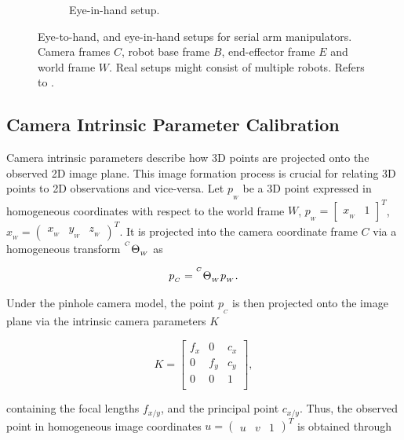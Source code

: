 \begin{figure}[tb]
\begin{subfigure}[b]{0.49\textwidth}
        \caption{Eye-in-hand setup.}
        \label{in:fig:eye_in_hand}
    \end{subfigure}
    \caption{Eye-to-hand, and eye-in-hand setups for serial arm manipulators. Camera frames $C$, robot base frame $B$, end-effector frame $E$ and world frame $W$. Real setups might consist of multiple robots. Refers to .}
    \label{in:fig:coordinate_frames}
\end{figure}

\subsection{Camera Intrinsic Parameter Calibration}
\label{in:sec:camera_intrinsic_calibration}
Camera intrinsic parameters describe how 3D points are projected onto the observed 2D image plane. This image formation process is crucial for relating 3D points to 2D observations and vice-versa. Let $p_{_W}$ be a 3D point expressed in homogeneous coordinates with respect to the world frame $W$, $p_{_W} = \begin{bmatrix}
    x_{_W} & 1
\end{bmatrix}^T$, $x_{_W} = \begin{pmatrix}
    x_{_W} & y_{_W} & z_{_W}
\end{pmatrix}^T$. It is projected into the camera coordinate frame $C$ via a homogeneous transform ${}^{^C}\Theta_{_W}$ as

\begin{equation}
    p_{_C} = {}^{^C}\Theta_{_W} p_{_W}.
\end{equation}

Under the pinhole camera model, the point $p_{_C}$ is then projected onto the image plane via the intrinsic camera parameters $K$

\begin{equation}
    K = \begin{bmatrix}
        f_x & 0 & c_x \\
        0 & f_y & c_y \\
        0 & 0 & 1 \\
    \end{bmatrix},
\end{equation}

containing the focal lengths $f_{x/y}$, and the principal point $c_{x/y}$. Thus, the observed point in homogeneous image coordinates $u = \begin{pmatrix}
    u & v & 1
\end{pmatrix}^T$ is obtained through

